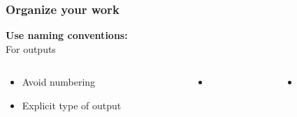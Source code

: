 \documentclass[xcolor=x11names,compress]{beamer}
\renewcommand{\(}{\begin{columns}}
\renewcommand{\)}{\end{columns}}
\newcommand{\<}[1]{\begin{column}{#1}}
\renewcommand{\>}{\end{column}}
\begin{document}
\begin{frame}
\frametitle{Organize your work }
\textcolor{siap}{\textbf{Use naming conventions:} \\ }
For outputs
\begin{columns}[t]
 \begin{column}{0.3\textwidth}
    \begin{itemize}[<+->]
   \item Avoid numbering
   \item Explicit type of output
    \end{itemize}
\end{column}
  \begin{column}{0.2\textwidth}
    \begin{itemize}
    \item[]
    \end{itemize}
  \end{column}
  \begin{column}{0.5\textwidth}
    \begin{itemize}
    \item[]
    \end{itemize}
  \end{column}
\end{columns}
\end{frame}
\end{document}
